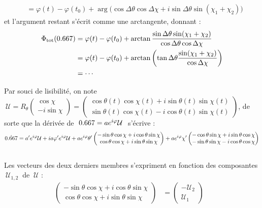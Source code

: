 \begin{demo}
\begin{align*}
		&= \varphi(t) - \varphi(t_0) + \arg\Big( \cos\Delta\theta \cos\Delta\chi + i\sin\Delta\theta \sin(\chi_1+\chi_2) \Big)
	\end{align*}
	et l'argument restant s'écrit comme une arctangente, donnant :
	\begin{align*}
		\phaset(\x) &= \varphi(t)-\varphi(t_0) + \arctan\frac{\sin\Delta\theta \sin(\chi_1+\chi_2)}{\cos\Delta\theta \cos\Delta\chi} \\
		&= \varphi(t)-\varphi(t_0) + \arctan \left( \tan\Delta\theta\frac{\sin(\chi_1+\chi_2)}{\cos\Delta\chi} \right) \\
		&= \cdots
	\end{align*}
\end{demo}

\begin{demo}
	Par souci de lisibilité, on note $\ \mathcal{U} = R_{\theta} \begin{pmatrix} \cos\chi \\ -i\sin\chi \end{pmatrix} = \begin{pmatrix} \cos\theta(t) \cos\chi(t) + i\sin\theta(t) \sin\chi(t) \\ \sin\theta(t) \cos\chi(t) - i\cos\theta(t) \sin\chi(t) \end{pmatrix}$, de sorte que la dérivée de $\ \x=ae^{i\varphi}\mathcal{U}\ $ s'écrive :
	\[\dot{\x} = a'e^{i\varphi}\mathcal{U} + ia\varphi'e^{i\varphi} \mathcal{U} + ae^{i\varphi}\theta'\begin{pmatrix} -\sin\theta \cos\chi + i\cos\theta \sin\chi \\ \cos\theta \cos\chi + i\sin\theta \sin\chi \end{pmatrix} + ae^{i\varphi}\chi'\begin{pmatrix} -\cos\theta \sin\chi + i\sin\theta \cos\chi \\ -\sin\theta \sin\chi - i\cos\theta \cos\chi \end{pmatrix}\]
	\\
	Les vecteurs des deux derniers membres s'expriment en fonction des composantes $\ \mathcal{U}_{1,2}\ $ de $\ \mathcal{U}$ :
	\begin{align*}
		\begin{pmatrix} -\sin\theta \cos\chi + i\cos\theta \sin\chi \\ \cos\theta \cos\chi + i\sin\theta \sin\chi \end{pmatrix} &= \begin{pmatrix} -\mathcal{U}_2 \\ \mathcal{U}_1 \end{pmatrix}  &

\end{align*}
\end{demo}
